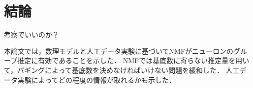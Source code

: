 \chapter{結論}
考察でいいのか？

本論文では，数理モデルと人工データ実験に基づいてNMFがニューロンのグループ推定に有効であることを示した．
NMFでは基底数に寄らない推定量を用いて，バギングによって基底数を決めなければいけない問題を緩和した．
人工データ実験によってどの程度の情報が取れるかも示した．
